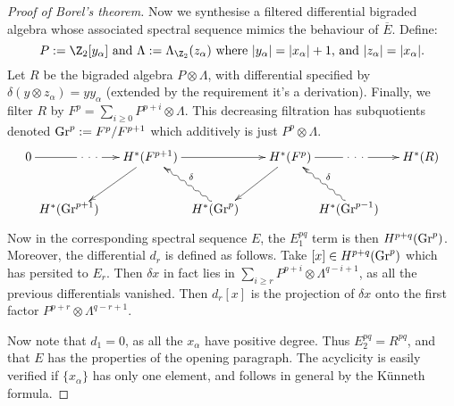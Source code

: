 \documentclass[11pt]{article}
\begin{document}
{\begin{proof}[Proof of Borel's theorem]
Now we synthesise a filtered differential bigraded algebra whose associated spectral sequence mimics the behaviour of $\overline E$. Define:
\[P:=\Z_2[y_\alpha]\text{ and }\Lambda:=\Lambda_{\Z_2}(z_\alpha)\text{ where $|y_\alpha|=|x_\alpha|+1$, and $|z_\alpha|=|x_\alpha|.$}\]
Let $R$ be the bigraded algebra $P\otimes\Lambda$, with differential specified by $\delta(y\otimes z_\alpha)=yy_\alpha$ (extended by the requirement it's a derivation). Finally, we filter $R$ by $F^p=\sum_{i\geq 0}P^{p+i}\otimes\Lambda$. This decreasing filtration has subquotients denoted $\textup{Gr}^p:=F^p/F^{p+1}$ which additively is just $P^p\otimes\Lambda$.
\[\xymatrix{
0\ar[rr]|{\ \cdot\ \cdot\ \cdot\ }&&H^*(F^{p+1})\ar[rr] \ar[ld]&&H^*(F^{p})\ar[ld]
\ar[rr]|{\ \cdot\ \cdot\ \cdot\ }&&H^*(R)\\
&
\shrt{H^*(\Gr^{p+1})}\phantom{\binom{5}{3}}&&
\shrt{H^*(\Gr^{p})}\phantom{\binom{5}{3}}\ar@{~>}[lu]_\delta&&
\shrt{H^*(\Gr^{p-1})}\phantom{\binom{5}{3}}\ar@{~>}[lu]_\delta
}\]
Now in the corresponding spectral sequence $E$, the $E_1^{pq}$ term is then $H^{p+q}(\textup{Gr}^p)$. Moreover, the differential $d_r$ is defined as follows. Take $[x]\in H^{p+q}(\textup{Gr}^p)$ which has persited to $E_r$. Then $\delta x$  in fact lies in $\sum_{i\geq r}P^{p+i}\otimes \Lambda^{q-i+1}$, as all the previous differentials vanished. Then $d_r[x]$ is the projection of $\delta x$ onto the first factor $P^{p+r}\otimes \Lambda^{q-r+1}$.

Now note that $d_1=0$, as all the $x_\alpha$ have positive degree. Thus $E_2^{pq}=R^{pq}$, and that $E$ has the properties of the opening paragraph. The acyclicity is easily verified if $\{x_\alpha\}$ has only one element, and follows in general by the K\"unneth formula.


\end{proof}}
\end{document}
